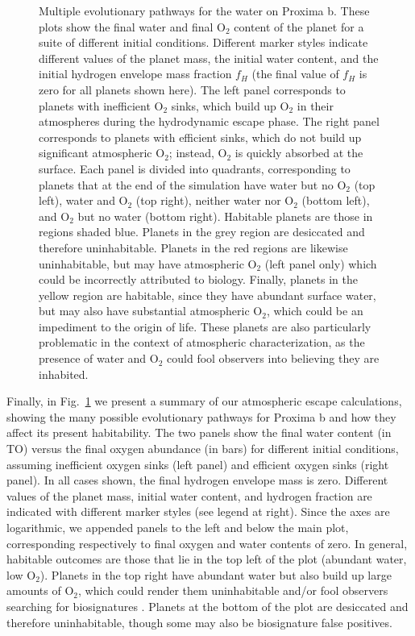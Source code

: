 \documentclass[preprint,12pt]{aastex}
\def\imagebox#1#2{\vtop to #1{\null\hbox{#2}\vfill}} %
\begin{document}
\begin{figure}
\centering
\subfigure{\label{fig:atmesc:synth:a}\imagebox{2.5in}{\texttt{[image: synth\_a]}}}
\subfigure{\label{fig:atmesc:synth:b}\imagebox{2.5in}{\texttt{[image: synth\_b]}}}
\subfigure{\label{fig:atmesc:synth:c}\imagebox{2.5in}{\texttt{[image: synth\_c]}}}
\caption{Multiple evolutionary pathways for the water on Proxima
  b. These plots show the final water and final O$_2$ content of the
  planet for a suite of different initial conditions. Different marker
  styles indicate different values of the planet mass, the initial
  water content, and the initial hydrogen envelope mass fraction $f_H$
  (the final value of $f_H$ is zero for all planets shown here).  The
  left panel corresponds to planets with inefficient O$_2$ sinks,
  which build up O$_2$ in their atmospheres during the hydrodynamic
  escape phase. The right panel corresponds to planets with efficient
  sinks, which do not build up significant atmospheric O$_2$; instead,
  O$_2$ is quickly absorbed at the surface. Each panel is divided into
  quadrants, corresponding to planets that at the end of the
  simulation have water but no O$_2$ (top left), water and O$_2$ (top
  right), neither water nor O$_2$ (bottom left), and O$_2$ but no
  water (bottom right). Habitable planets are those in regions shaded
  blue. Planets in the grey region are desiccated and therefore
  uninhabitable. Planets in the red regions are likewise
  uninhabitable, but may have atmospheric O$_2$ (left panel only)
  which could be incorrectly attributed to biology. Finally, planets
  in the yellow region are habitable, since they have abundant surface
  water, but may also have substantial atmospheric O$_2$, which could
  be an impediment to the origin of life. These planets are also
  particularly problematic in the context of atmospheric
  characterization, as the presence of water and O$_2$ could fool
  observers into believing they are inhabited.}
\label{fig:atmesc:synth}
\end{figure}

Finally, in Fig.~\ref{fig:atmesc:synth} we present a summary of our
atmospheric escape calculations, showing the many possible
evolutionary pathways for Proxima b and how they affect its present
habitability. The two panels show the final water content (in TO)
versus the final oxygen abundance (in bars) for different initial
conditions, assuming inefficient oxygen sinks (left panel) and
efficient oxygen sinks (right panel). In all cases shown, the final
hydrogen envelope mass is zero.  Different values of the planet mass,
initial water content, and hydrogen fraction are indicated with
different marker styles (see legend at right). Since the axes are
logarithmic, we appended panels to the left and below the main plot,
corresponding respectively to final oxygen and water contents of
zero. In general, habitable outcomes are those that lie in the top
left of the plot (abundant water, low O$_2$). Planets in the top right
have abundant water but also build up large amounts of O$_2$, which
could render them uninhabitable and/or fool
observers searching for biosignatures \citep{LugerBarnes15}. Planets at the bottom of the
plot are desiccated and therefore uninhabitable, though some may also
be biosignature false positives.
\end{document}
